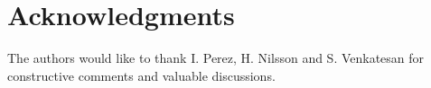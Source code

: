 \section*{Acknowledgments}
The authors would like to thank I. Perez, H. Nilsson and S. Venkatesan for constructive comments and valuable discussions.